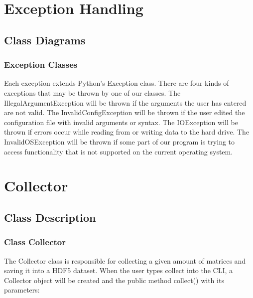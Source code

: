 \documentclass[parskip=full]{scrartcl}
\begin{document}


\section{Exception Handling}

\subsection{Class Diagrams}

\subsubsection{Exception Classes}

Each exception extends Python's Exception class.
There are four kinds of exceptions that may be thrown by one of our classes.\newline\newline
The IllegalArgumentException will be thrown if the arguments the user has entered are not valid.\newline\newline
The InvalidConfigException will be thrown if the user edited the configuration file with invalid arguments or syntax.\newline\newline
The IOException will be thrown if errors occur while reading from or writing data to the hard drive.\newline\newline
The InvalidOSException will be thrown if some part of our program is trying to access functionality that is not supported on the current operating system.



\section{Collector}

\subsection{Class Description}

\subsubsection{Class Collector}
The Collector class is responsible for collecting a given amount of matrices and saving it into a HDF5 dataset.
When the user types collect into the CLI, a Collector object will be created and the public method collect() with its parameters:
\end{document}
